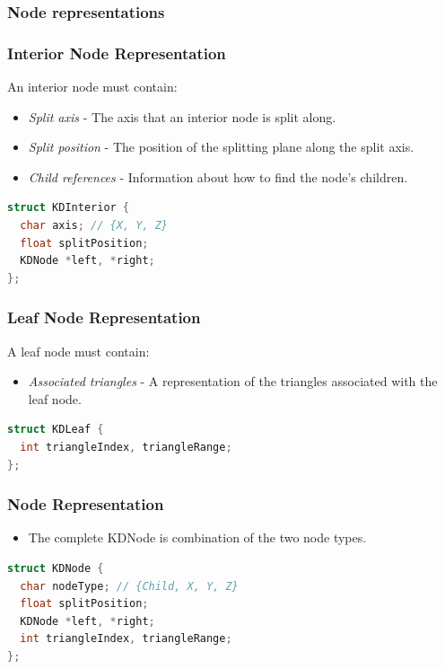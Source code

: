 \documentclass{beamer}
\begin{document}
\subsubsection{Node representations}
\begin{frame}[fragile]
  \frametitle{Interior Node Representation}
  An interior node must contain:
  \begin{itemize}
  \item \textit{Split axis} - The axis that an interior node is split
    along.
  \item \textit{Split position} - The position of the splitting plane
    along the split axis.
  \item \textit{Child references} - Information about how to find the
    node's children.
  \end{itemize}

  \begin{lstlisting}[language=C++]
struct KDInterior {
  char axis; // {X, Y, Z}
  float splitPosition;
  KDNode *left, *right;
};
  \end{lstlisting}
\end{frame}

\begin{frame}[fragile]
  \frametitle{Leaf Node Representation}
  A leaf node must contain:
  \begin{itemize}
    \item \textit{Associated triangles} - A representation of the triangles
      associated with the leaf node.
  \end{itemize}
  \begin{lstlisting}[language=C++]
struct KDLeaf {
  int triangleIndex, triangleRange;
};
  \end{lstlisting}
\end{frame}

\begin{frame}[fragile]
  \frametitle{Node Representation}
  \begin{itemize}
  \item The complete KDNode is combination of the two node types.
  \end{itemize}
  
  \begin{lstlisting}[language=C++]
struct KDNode {
  char nodeType; // {Child, X, Y, Z}
  float splitPosition;
  KDNode *left, *right;
  int triangleIndex, triangleRange;
};
  \end{lstlisting}
\end{frame}
\end{document}
